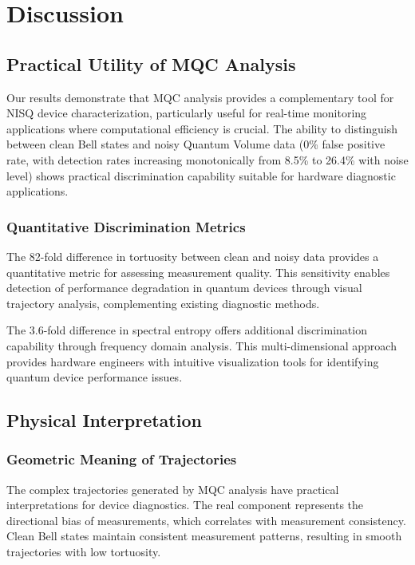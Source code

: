 \section{Discussion}
\label{sec:discussion}

\subsection{Practical Utility of MQC Analysis}

Our results demonstrate that MQC analysis provides a complementary tool for NISQ device characterization, particularly useful for real-time monitoring applications where computational efficiency is crucial. The ability to distinguish between clean Bell states and noisy Quantum Volume data (0\% false positive rate, with detection rates increasing monotonically from 8.5\% to 26.4\% with noise level) shows practical discrimination capability suitable for hardware diagnostic applications.

\subsubsection{Quantitative Discrimination Metrics}
The 82-fold difference in tortuosity between clean and noisy data provides a quantitative metric for assessing measurement quality. This sensitivity enables detection of performance degradation in quantum devices through visual trajectory analysis, complementing existing diagnostic methods.

The 3.6-fold difference in spectral entropy offers additional discrimination capability through frequency domain analysis. This multi-dimensional approach provides hardware engineers with intuitive visualization tools for identifying quantum device performance issues.

\subsection{Physical Interpretation}

\subsubsection{Geometric Meaning of Trajectories}
The complex trajectories generated by MQC analysis have practical interpretations for device diagnostics. The real component represents the directional bias of measurements, which correlates with measurement consistency. Clean Bell states maintain consistent measurement patterns, resulting in smooth trajectories with low tortuosity.

